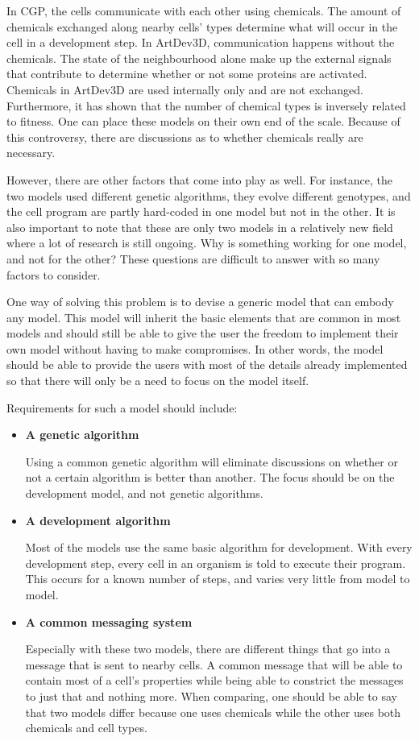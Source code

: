 In CGP, the cells communicate with each other using chemicals. The amount of chemicals exchanged along nearby cells' types determine what will occur in the cell in a development step. In ArtDev3D, communication happens without the chemicals. The state of the neighbourhood alone make up the external signals that contribute to determine whether or not some proteins are activated. Chemicals in ArtDev3D are used internally only and are not exchanged. Furthermore, it has shown that the number of chemical types is inversely related to fitness. One can place these models on their own end of the scale. Because of this controversy, there are discussions as to whether chemicals really are necessary.

However, there are other factors that come into play as well. For instance, the two models used different genetic algorithms, they evolve different genotypes, and the cell program are partly hard-coded in one model but not in the other. It is also important to note that these are only two models in a relatively new field where a lot of research is still ongoing. Why is something working for one model, and not for the other? These questions are difficult to answer with so many factors to consider.

One way of solving this problem is to devise a generic model that can embody any model. This model will inherit the basic elements that are common in most models and should still be able to give the user the freedom to implement their own model without having to make compromises. In other words, the model should be able to provide the users with most of the details already implemented so that there will only be a need to focus on the model itself.

Requirements for such a model should include:
\begin{itemize}
	\itemsep=0pt
	\item\textbf{A genetic algorithm}

	Using a common genetic algorithm will eliminate discussions on whether or not a certain algorithm is better than another. The focus should be on the development model, and not genetic algorithms.

	\item\textbf{A development algorithm}

	Most of the models use the same basic algorithm for development. With every development step, every cell in an organism is told to execute their program. This occurs for a known number of steps, and varies very little from model to model.

	\item\textbf{A common messaging system}

	Especially with these two models, there are different things that go into a message that is sent to nearby cells. A common message that will be able to contain most of a cell's properties while being able to constrict the messages to just that and nothing more. When comparing, one should be able to say that two models differ because one uses chemicals while the other uses both chemicals and cell types.
\end{itemize}

